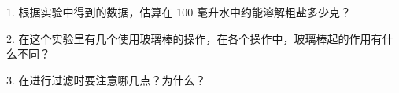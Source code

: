 \begin{wentihetaolun}

    1. 根据实验中得到的数据，估算在 100 毫升水中约能溶解粗盐多少克？

    2. 在这个实验里有几个使用玻璃棒的操作，在各个操作中，玻璃棒起的作用有什么不同？

    3. 在进行过滤时要注意哪几点？为什么？

\end{wentihetaolun}
